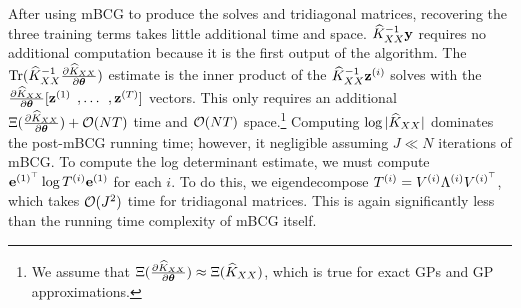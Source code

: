 After using mBCG to produce the solves and tridiagonal matrices, recovering the three training terms takes little additional time and space.
$\widehat{K}_{XX}^{-1}\mathbf{y}$ requires no additional computation because it is the first output of the algorithm.
The $\tr{\trainK^{-1}\frac{\partial \trainK}{\partial \btheta}}$ estimate is the inner product of the $\widehat{K}_{XX}^{-1} \mathbf{z}^{(i)}$ solves with the $\frac{\partial \widehat{K}_{XX}}{\partial \boldsymbol{\theta}}[\mathbf{z}^{(1)} \:\:, \ldots \:\:, \mathbf{z}^{(T)}]$ vectors.
This only requires an additional $\mmm{\frac{\partial \trainK}{\partial \btheta}} + \bigo{NT}$ time and $\bigo{NT}$ space.\footnote{
	We assume that $\Xi (\frac{\partial \widehat{K}_{XX}}{\partial \boldsymbol{\theta}}) \approx \Xi (\widehat{K}_{XX})$, which is true for exact GPs and GP approximations.
}
Computing $\log \vert \widehat{K}_{XX} \vert$ dominates the post-mBCG running time; however, it negligible assuming $J \ll N$ iterations of mBCG.
To compute the log determinant estimate, we must compute $\mathbf{e}^{(1)^\top} \log T^{(i)} \mathbf{e}^{(1)}$ for each $i$.
To do this, we eigendecompose ${T}^{(i)} = V^{(i)} \Lambda^{(i)} V^{(i)^\top}$, which takes $\bigo{J^{2}}$ time for tridiagonal matrices.
This is again significantly less than the running time complexity of mBCG itself.
